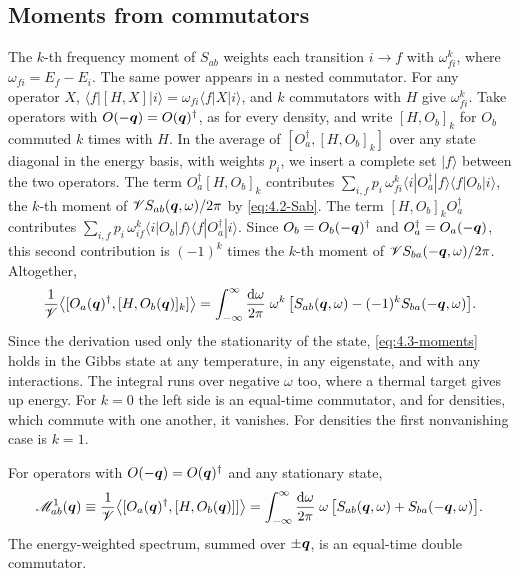 \subsection{Moments from commutators}

The $k$-th frequency moment of $S_{ab}$ weights each transition $i \to f$ with $\omega_{fi}^k$, where $\omega_{fi} = E_f - E_i$. The same power appears in a nested commutator. For any operator $X$, $\langle f|[H, X]|i\rangle = \omega_{fi}\langle f|X|i\rangle$, and $k$ commutators with $H$ give $\omega_{fi}^k$. Take operators with $O(-\bm{q}) = O(\bm{q})^\dagger$, as for every density, and write $[H, O_b]_k$ for $O_b$ commuted $k$ times with $H$. In the average of $[O_a^\dagger, [H, O_b]_k]$ over any state diagonal in the energy basis, with weights $p_i$, we insert a complete set $|f\rangle$ between the two operators. The term $O_a^\dagger[H, O_b]_k$ contributes $\sum_{i,f}p_i\,\omega_{fi}^k\langle i|O_a^\dagger|f\rangle\langle f|O_b|i\rangle$, the $k$-th moment of $\mathscr{V} S_{ab}(\bm{q},\omega)/2\pi$ by \cref{eq:4.2-Sab}. The term $[H, O_b]_kO_a^\dagger$ contributes $\sum_{i,f}p_i\,\omega_{if}^k\langle i|O_b|f\rangle\langle f|O_a^\dagger|i\rangle$. Since $O_b = O_b(-\bm{q})^\dagger$ and $O_a^\dagger = O_a(-\bm{q})$, this second contribution is $(-1)^k$ times the $k$-th moment of $\mathscr{V} S_{ba}(-\bm{q},\omega)/2\pi$. Altogether,
\begin{equation}
  \frac{1}{\mathscr{V}}\bigl\langle[O_a(\bm{q})^\dagger, [H, O_b(\bm{q})]_k]\bigr\rangle = \int_{-\infty}^{\infty}\frac{\mathrm{d}\omega}{2\pi}\;\omega^k\,\bigl[S_{ab}(\bm{q},\omega) - (-1)^kS_{ba}(-\bm{q},\omega)\bigr] .
  \label{eq:4.3-moments}
\end{equation}
Since the derivation used only the stationarity of the state, \cref{eq:4.3-moments} holds in the Gibbs state at any temperature, in any eigenstate, and with any interactions. The integral runs over negative $\omega$ too, where a thermal target gives up energy. For $k = 0$ the left side is an equal-time commutator, and for densities, which commute with one another, it vanishes. For densities the first nonvanishing case is $k = 1$.
\begin{keyresult}
For operators with $O(-\bm{q}) = O(\bm{q})^\dagger$ and any stationary state,
\begin{equation}
  \mathscr{M}^1_{ab}(\bm{q}) \equiv \frac{1}{\mathscr{V}}\bigl\langle[O_a(\bm{q})^\dagger, [H, O_b(\bm{q})]]\bigr\rangle = \int_{-\infty}^{\infty}\frac{\mathrm{d}\omega}{2\pi}\;\omega\,\bigl[S_{ab}(\bm{q},\omega) + S_{ba}(-\bm{q},\omega)\bigr] .
  \label{eq:4.3-firstmoment}
\end{equation}
The energy-weighted spectrum, summed over $\pm\bm{q}$, is an equal-time double commutator.
\end{keyresult}
